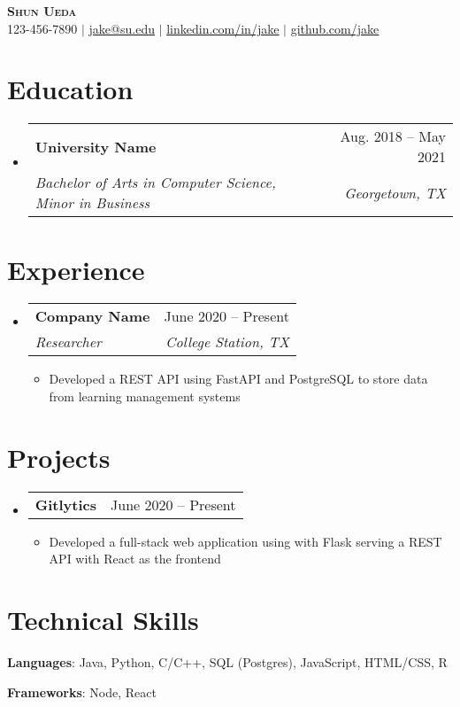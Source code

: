\documentclass[letterpaper,12pt]{extarticle}
\makeatletter
\newcommand{\resumeItem}[1]{
  \item\small{
    {#1 \vspace{-2pt}}
  }
}
\newcommand{\resumeSubheading}[4]{
  \vspace{-1pt}\item
    \begin{tabular*}{0.97\textwidth}[t]{l@{\extracolsep{\fill}}r}
      \textbf{#1} & \small #2 \\
      \textit{\small #3} & \textit{\small #4} \\
    \end{tabular*}\vspace{-7pt}
}
\newcommand{\resumeProjectHeading}[2]{
    \item
    \begin{tabular*}{0.97\textwidth}{l@{\extracolsep{\fill}}r}
      \textbf{#1} & \small #2 \\
    \end{tabular*}\vspace{-7pt}
}
\newcommand{\resumeSubHeadingListStart}{\begin{itemize}[leftmargin=0.15in, label={}]}
\newcommand{\resumeSubHeadingListEnd}{\end{itemize}}
\newcommand{\resumeItemListStart}{
    \begin{itemize}
    \itemsep 2pt
}
\newcommand{\resumeItemListEnd}{\end{itemize}\vspace{-5pt}}
\makeatother
\begin{document}
\begin{center}
	\textbf{\Huge \scshape Shun Ueda} \\ \vspace{1pt}
	\small 123-456-7890 $|$ \href{mailto:x@x.com}{\underline{jake@su.edu}} $|$
	\href{https://linkedin.com/in/...}{\underline{linkedin.com/in/jake}} $|$
	\href{https://github.com/...}{\underline{github.com/jake}}
\end{center}


\section{Education}
\resumeSubHeadingListStart
\resumeSubheading
{University Name}{Aug. 2018 -- May 2021}
{Bachelor of Arts in Computer Science, Minor in Business}{Georgetown, TX}
\resumeSubHeadingListEnd

\section{Experience}
\resumeSubHeadingListStart
\resumeSubheading
{Company Name}{June 2020 -- Present}
{Researcher}{College Station, TX}
\resumeItemListStart
\resumeItem{Developed a REST API using FastAPI and PostgreSQL to store data from learning management systems}
\resumeItemListEnd
\resumeSubHeadingListEnd


\section{Projects}
\resumeSubHeadingListStart
\resumeProjectHeading
{\textbf{Gitlytics}}{June 2020 -- Present}
\resumeItemListStart
\resumeItem{Developed a full-stack web application using with Flask serving a REST API with React as the frontend}
\resumeItemListEnd
\resumeSubHeadingListEnd



\section{Technical Skills}
\begin{itemize}[leftmargin=0.15in, label={}]
    \itemsep -2pt
	\small{\item{
		\textbf{Languages}{: Java, Python, C/C++, SQL (Postgres), JavaScript, HTML/CSS, R} \\
	}}
    \small{\item{
        \textbf{Frameworks}{: Node, React} \\
	}}
\end{itemize}

\end{document}
